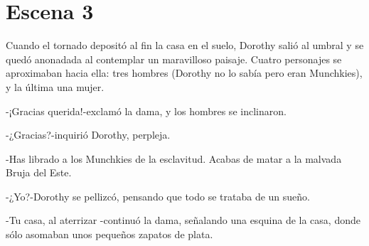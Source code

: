\chapter{Escena 3}

Cuando el tornado depositó al fin la casa en el suelo, Dorothy salió al umbral y se quedó anonadada al contemplar un maravilloso paisaje. Cuatro personajes se aproximaban hacia ella: tres hombres (Dorothy no lo sabía pero eran Munchkies), y la última una mujer.

-¡Gracias querida!-exclamó la dama, y los hombres se inclinaron.

-¿Gracias?-inquirió Dorothy, perpleja.

-Has librado a los Munchkies de la esclavitud. Acabas de matar a la malvada Bruja del Este.

-¿Yo?-Dorothy se pellizcó, pensando que todo se trataba de un sueño.

-Tu casa, al aterrizar -continuó la dama, señalando una esquina de la casa, donde sólo asomaban unos pequeños zapatos de plata.
